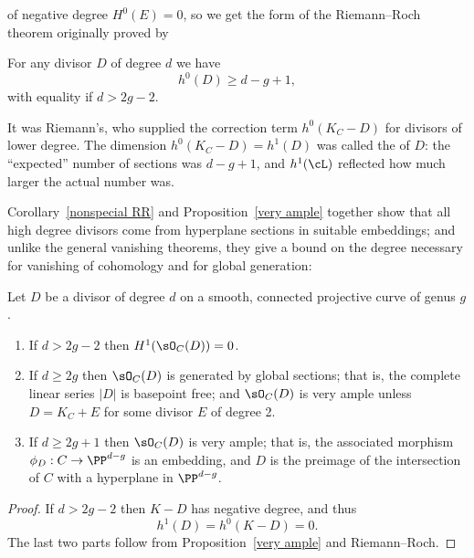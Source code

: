 of negative degree 
$H^0(E) = 0$,
so we get the form of the Riemann--Roch theorem
originally proved by 
%

\begin{corollary}\label{nonspecial RR}
For any divisor $D$ of degree $d$ we have
$$
h^0(D) \geq d - g + 1,
$$
with equality if $d > 2g-2$.
\end{corollary}
%
It was 
%
Riemann's, 
who supplied the correction term $h^0(K_C - D)$ for divisors of lower degree.
The dimension $h^0(K_C-D) = h^1(D)$ was called the 
%
of $D$: the ``expected'' number of sections was $d-g+1$, and $h^1(\cL)$ reflected how much larger the actual number was.

Corollary~\ref{nonspecial RR} and Proposition~\ref{very ample} together show that all high degree divisors come from hyperplane sections in 
suitable embeddings; and unlike the general vanishing theorems, they give a bound on the degree necessary for vanishing
of cohomology and for
global generation:

\begin{corollary}\label{degree 2g+1 embedding}
Let $D$ be a divisor of degree $d$ on a smooth, connected projective curve of genus $g$.
\begin{enumerate}
 \item If $d>2g-2$ then $H^1(\sO_C(D)) = 0$.
 \item If $d \geq 2g$ then $\sO_C(D)$ is generated by global sections; that is, the complete linear series $|D|$ is basepoint free; and $\sO_C(D)$ is very ample unless $D = K_{C}+E$ for some divisor $E$ of degree 2.
 \item If $d \geq 2g+1$ then $\sO_C(D)$ is very ample; that is, the associated morphism $\phi_D : C \to \PP^{d-g}$ is an embedding, and
$D$ is the preimage of the intersection of $C$ with a hyperplane in $ \PP^{d-g}$.
\end{enumerate}
\end{corollary}

\begin{proof}
If $d>2g-2$ then $K-D$ has negative degree, and thus 
$$h^1(D) = h^0(K-D) = 0. $$ 
The last two parts follow
from Proposition~\ref{very ample} and Riemann--Roch.
\end{proof}

